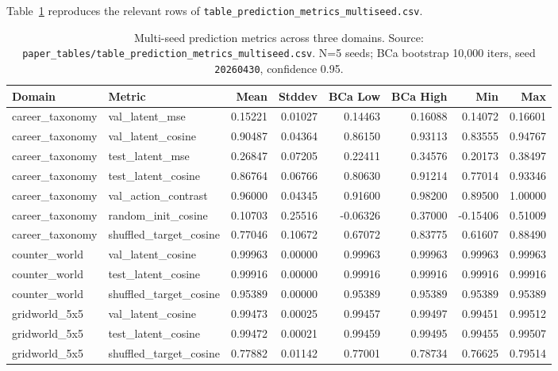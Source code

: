 \documentclass[10pt,twocolumn,letterpaper]{article}
\newcommand{\code}[1]{\texttt{\small #1}}
\begin{document}
Table~\ref{tab:pred-metrics} reproduces the relevant rows of
\code{table\_prediction\_metrics\_multiseed.csv}.

\begin{table}[t]
\caption{Multi-seed prediction metrics across three domains.
  Source:
  \texttt{paper\_tables/table\_prediction\_metrics\_multiseed.csv}.
  N=5 seeds; BCa bootstrap 10{,}000 iters, seed
  \texttt{20260430}, confidence 0.95.}
\label{tab:pred-metrics}
\centering\footnotesize
\begin{tabular}{llrrrrrr}
\toprule
Domain & Metric & Mean & Stddev & BCa Low & BCa High & Min & Max \\
\midrule
career\_taxonomy & val\_latent\_mse        & 0.15221 & 0.01027 & 0.14463 & 0.16088 & 0.14072 & 0.16601 \\
career\_taxonomy & val\_latent\_cosine     & 0.90487 & 0.04364 & 0.86150 & 0.93113 & 0.83555 & 0.94767 \\
career\_taxonomy & test\_latent\_mse       & 0.26847 & 0.07205 & 0.22411 & 0.34576 & 0.20173 & 0.38497 \\
career\_taxonomy & test\_latent\_cosine    & 0.86764 & 0.06766 & 0.80630 & 0.91214 & 0.77014 & 0.93346 \\
career\_taxonomy & val\_action\_contrast   & 0.96000 & 0.04345 & 0.91600 & 0.98200 & 0.89500 & 1.00000 \\
career\_taxonomy & random\_init\_cosine    & 0.10703 & 0.25516 & -0.06326 & 0.37000 & -0.15406 & 0.51009 \\
career\_taxonomy & shuffled\_target\_cosine& 0.77046 & 0.10672 & 0.67072 & 0.83775 & 0.61607 & 0.88490 \\
\midrule
counter\_world   & val\_latent\_cosine     & 0.99963 & 0.00000 & 0.99963 & 0.99963 & 0.99963 & 0.99963 \\
counter\_world   & test\_latent\_cosine    & 0.99916 & 0.00000 & 0.99916 & 0.99916 & 0.99916 & 0.99916 \\
counter\_world   & shuffled\_target\_cosine& 0.95389 & 0.00000 & 0.95389 & 0.95389 & 0.95389 & 0.95389 \\
\midrule
gridworld\_5x5   & val\_latent\_cosine     & 0.99473 & 0.00025 & 0.99457 & 0.99497 & 0.99451 & 0.99512 \\
gridworld\_5x5   & test\_latent\_cosine    & 0.99472 & 0.00021 & 0.99459 & 0.99495 & 0.99455 & 0.99507 \\
gridworld\_5x5   & shuffled\_target\_cosine& 0.77882 & 0.01142 & 0.77001 & 0.78734 & 0.76625 & 0.79514 \\
\bottomrule
\end{tabular}
\end{table}
\end{document}
